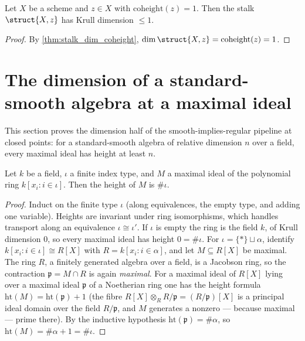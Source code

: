 \begin{lemma}
  \label{lem:stalk_dimLE_one}
  \leanok
  Let \(X\) be a scheme and \(z \in X\) with \(\mathrm{coheight}(z) = 1\). Then the
  stalk \(\struct{X,z}\) has Krull dimension \(\leq 1\).
\end{lemma}
\begin{proof}
  \leanok
  By \ref{thm:stalk_dim_coheight}, \(\dim \struct{X,z} = \mathrm{coheight}(z) = 1\).
\end{proof}

\section{The dimension of a standard-smooth algebra at a maximal ideal}
\label{sec:standard_smooth_dimension}

This section proves the dimension half of the smooth-implies-regular pipeline at closed
points: for a standard-smooth algebra of relative dimension \(n\) over a field, every
maximal ideal has height at least \(n\).

\begin{theorem}
  \label{thm:mvpoly_maximal_height}
  \leanok
  Let \(k\) be a field, \(\iota\) a finite index type, and \(M\) a maximal ideal of the
  polynomial ring \(k[x_i : i \in \iota]\). Then the height of \(M\) is \(\#\iota\).
\end{theorem}
\begin{proof}
  \leanok
  Induct on the finite type \(\iota\) (along equivalences, the empty type, and adding
  one variable). Heights are invariant under ring isomorphisms, which handles transport
  along an equivalence \(\iota \cong \iota'\). If \(\iota\) is empty the ring is the
  field \(k\), of Krull dimension \(0\), so every maximal ideal has height \(0 =
  \#\iota\). For \(\iota = \{*\} \sqcup \alpha\), identify
  \(k[x_i : i \in \iota] \cong R[X]\) with \(R = k[x_i : i \in \alpha]\), and let
  \(M \subseteq R[X]\) be maximal. The ring \(R\), a finitely generated algebra over a
  field, is a Jacobson ring, so the contraction \(\mathfrak p = M \cap R\) is again
  \emph{maximal}. For a maximal ideal of \(R[X]\) lying over a maximal ideal
  \(\mathfrak p\) of a Noetherian ring one has the height formula
  \(\mathrm{ht}(M) = \mathrm{ht}(\mathfrak p) + 1\) (the fibre
  \(R[X] \otimes_R R/\mathfrak p = (R/\mathfrak p)[X]\) is a principal ideal domain over
  the field \(R/\mathfrak p\), and \(M\) generates a nonzero --- because maximal ---
  prime there). By the inductive hypothesis \(\mathrm{ht}(\mathfrak p) = \#\alpha\), so
  \(\mathrm{ht}(M) = \#\alpha + 1 = \#\iota\).
\end{proof}

